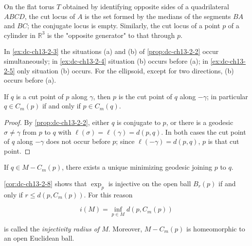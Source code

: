\begin{example}
  \label{ex:dc-ch13-2-5}
  On the flat torus $T$ obtained by identifying opposite sides of a quadrilateral
  $ABCD$, the cut locus of $A$ is the set formed by the medians of the segments $BA$
  and $BC$; the conjugate locus is empty. Similarly, the cut locus of a point $p$ of
  a cylinder in $\mathbb{R}^3$ is the "opposite generator" to that through $p$.
\end{example}

\begin{remark}
  \label{rem:dc-ch13-2-6}
  In \cref{ex:dc-ch13-2-3} the situations (a) and (b) of \cref{prop:dc-ch13-2-2} occur simultaneously;
  in \cref{ex:dc-ch13-2-4} situation (b) occurs before (a); in \cref{ex:dc-ch13-2-5} only situation (b)
  occurs. For the ellipsoid, except for two directions, (b) occurs before (a).
\end{remark}

\begin{corollary}
  \label{cor:dc-ch13-2-7}
  If $q$ is a cut point of $p$ along $\gamma$, then $p$ is the cut point of $q$ along
  $-\gamma$; in particular $q\in C_m(p)$ if and only if $p\in C_m(q)$.
\end{corollary}
\begin{proof}
\sketch
  By \cref{prop:dc-ch13-2-2}, either $q$ is conjugate to $p$, or there is a geodesic
  $\sigma\neq\gamma$ from $p$ to $q$ with $\ell(\sigma)=\ell(\gamma)=d(p,q)$. In both
  cases the cut point of $q$ along $-\gamma$ does not occur before $p$; since
  $\ell(-\gamma)=d(p,q)$, $p$ is that cut point.
\end{proof}

\begin{corollary}
  \label{cor:dc-ch13-2-8}
  If $q\in M-C_m(p)$, there exists a unique minimizing geodesic joining $p$ to $q$.
  
  \cref{cor:dc-ch13-2-8} shows that $\exp_p$ is injective on the open ball $B_r(p)$ if and only
  if $r\leq d(p,C_m(p))$. For this reason
  
  $$
  i(M)=\inf_{p\in M}d(p,C_m(p))
  $$
  
  is called the \emph{injectivity radius of $M$}. Moreover, $M-C_m(p)$ is
  homeomorphic to an open Euclidean ball.
\end{corollary}

